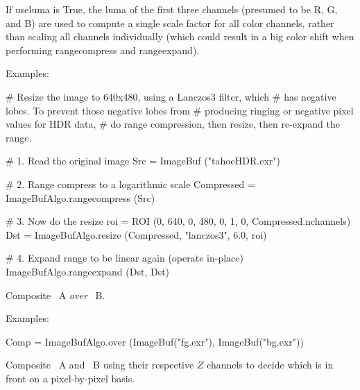 If {\cf useluma} is {\cf True}, the luma of the first three channels (presumed
to be R, G, and B) are used to compute a single scale factor for all
color channels, rather than scaling all channels individually (which
could result in a big color shift when performing {\cf rangecompress}
and {\cf rangeexpand}).

\smallskip
\noindent Examples:
\begin{code}
    # Resize the image to 640x480, using a Lanczos3 filter, which
    # has negative lobes. To prevent those negative lobes from
    # producing ringing or negative pixel values for HDR data,
    # do range compression, then resize, then re-expand the range.

    # 1. Read the original image
    Src = ImageBuf ("tahoeHDR.exr")

    # 2. Range compress to a logarithmic scale
    Compressed = ImageBufAlgo.rangecompress (Src)

    # 3. Now do the resize
    roi = ROI (0, 640, 0, 480, 0, 1, 0, Compressed.nchannels)
    Dst = ImageBufAlgo.resize (Compressed, "lanczos3", 6.0, roi)

    # 4. Expand range to be linear again (operate in-place)
    ImageBufAlgo.rangeexpand (Dst, Dst)
\end{code}
\apiend


 

Composite \ImageBuf\ {\cf A} \emph{over} \ImageBuf\ {\cf B}.

\smallskip
\noindent Examples:
\begin{code}
    Comp = ImageBufAlgo.over (ImageBuf("fg.exr"), ImageBuf("bg.exr"))
\end{code}
\apiend


 

Composite \ImageBuf\ {\cf A} and \ImageBuf\ {\cf B} using their respective
$Z$ channels to decide which is in front on a pixel-by-pixel basis.

